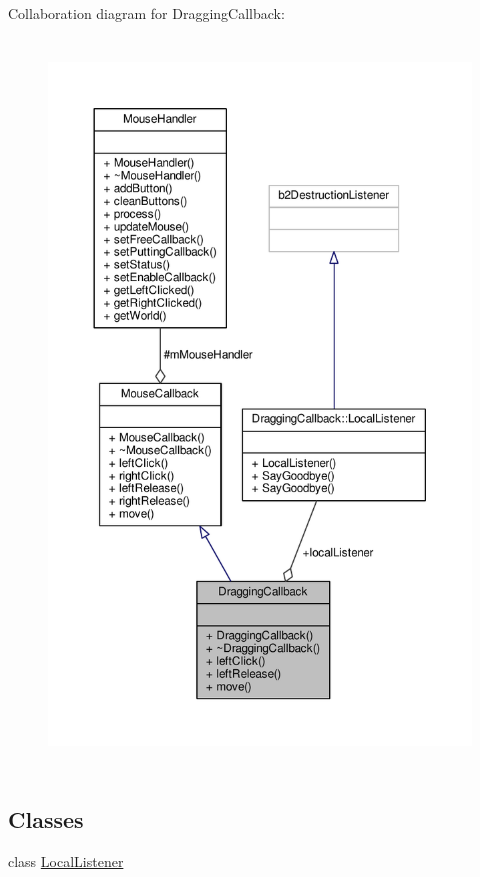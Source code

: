 Collaboration diagram for Dragging\+Callback\+:\nopagebreak
\begin{figure}[H]
\begin{center}
\leavevmode
\includegraphics[height=550pt]{classDraggingCallback__coll__graph}
\end{center}
\end{figure}
\subsection*{Classes}
\begin{DoxyCompactItemize}
\item 
class \hyperlink{classDraggingCallback_1_1LocalListener}{Local\+Listener}
\end{DoxyCompactItemize}
